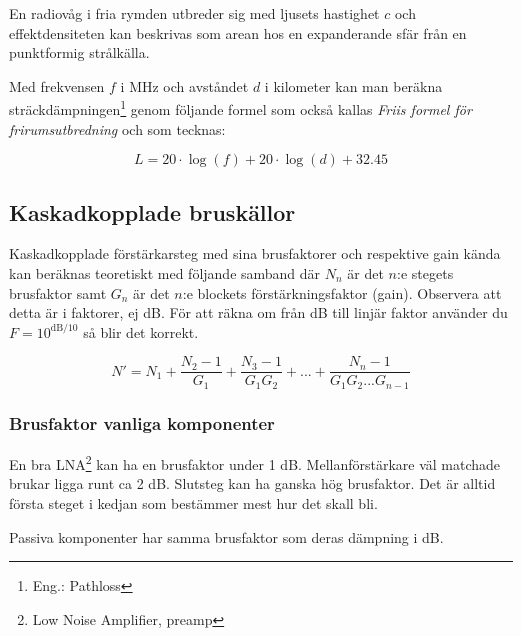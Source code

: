 \documentclass[12pt,swedish,a4paper]{article}
\begin{document}
En radiovåg i fria rymden utbreder sig med ljusets hastighet $c$ och effektdensiteten kan beskrivas som arean hos en expanderande sfär från en punktformig strålkälla.

Med frekvensen $f$ i MHz och avståndet $d$ i kilometer kan man beräkna sträck\-dämp\-ning\-en\footnote{Eng.: Pathloss} genom följande formel som också kallas \emph{Friis formel för frirumsutbredning} och som tecknas:

\begin{equation}
L=20\cdot \log(f) + 20\cdot \log(d) +32.45
\end{equation}

\subsection{Kaskadkopplade bruskällor}

Kaskadkopplade förstärkarsteg med sina brusfaktorer och respektive gain kända kan beräknas teoretiskt med följande samband där $N_n$ är det $n$:e stegets brusfaktor samt $G_n$ är det $n$:e blockets förstärkningsfaktor (gain). Observera att detta är i faktorer, ej dB. För att räkna om från dB till linjär faktor använder du $F=10^{\mathrm{dB}/10}$ så blir det korrekt.

\begin{equation}
N'=N_1+\frac{N_2-1}{G_1} + \frac{N_3-1}{G_1G_2} + ... + \frac{N_n-1}{G_1G_2...G_{n-1}}
\end{equation}

\subsubsection{Brusfaktor vanliga komponenter}

En bra LNA\footnote{Low Noise Amplifier, preamp} kan ha en brusfaktor under 1 dB. Mellanförstärkare väl matchade brukar ligga runt ca 2 dB. Slutsteg kan ha ganska hög brusfaktor. Det är alltid första steget i kedjan som bestämmer mest hur det skall bli.

Passiva komponenter har samma brusfaktor som deras dämpning i dB.
\end{document}
